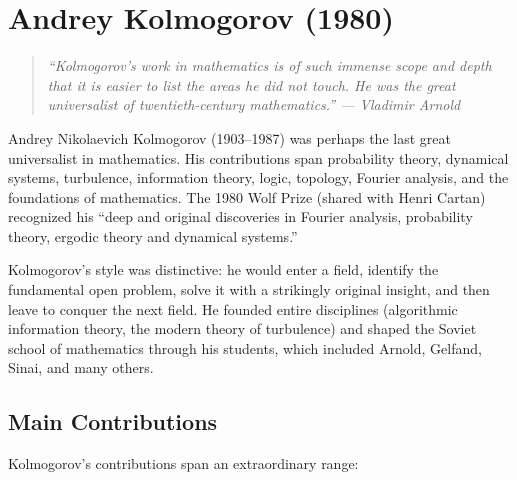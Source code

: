 \let\E\relax
\newcommand{\E}{\operatorname{\mathbb{E}}}
\let\Var\relax
\newcommand{\Var}{\operatorname{Var}}
\let\Cov\relax
\newcommand{\Cov}{\operatorname{Cov}}
\let\KL\relax
\newcommand{\KL}{\operatorname{KL}}
\let\Supp\relax
\newcommand{\Supp}{\operatorname{Supp}}
\let\Spec\relax
\newcommand{\Spec}{\operatorname{Spec}}
\let\im\relax
\newcommand{\im}{\operatorname{im}}
\let\const\relax
\newcommand{\const}{\operatorname{const}}
\let\Ent\relax
\newcommand{\Ent}{\operatorname{Ent}}
\let\N\relax
\newcommand{\N}{\mathbb{N}}
\let\R\relax
\newcommand{\R}{\mathbb{R}}
\let\C\relax
\newcommand{\C}{\mathbb{C}}
\let\Q\relax
\newcommand{\Q}{\mathbb{Q}}
\let\Z\relax
\newcommand{\Z}{\mathbb{Z}}

\chapter{Andrey Kolmogorov (1980)}

\begin{quote}
\it ``Kolmogorov's work in mathematics is of such immense scope and depth that it is easier to list the areas he did not touch. He was the great universalist of twentieth-century mathematics.'' --- Vladimir Arnold
\end{quote}

Andrey Nikolaevich Kolmogorov (1903--1987) was perhaps the last great universalist in mathematics. His contributions span probability theory, dynamical systems, turbulence, information theory, logic, topology, Fourier analysis, and the foundations of mathematics. The 1980 Wolf Prize (shared with Henri Cartan) recognized his ``deep and original discoveries in Fourier analysis, probability theory, ergodic theory and dynamical systems.''

Kolmogorov's style was distinctive: he would enter a field, identify the fundamental open problem, solve it with a strikingly original insight, and then leave to conquer the next field. He founded entire disciplines (algorithmic information theory, the modern theory of turbulence) and shaped the Soviet school of mathematics through his students, which included Arnold, Gelfand, Sinai, and many others.

\section{Main Contributions}

Kolmogorov's contributions span an extraordinary range:

